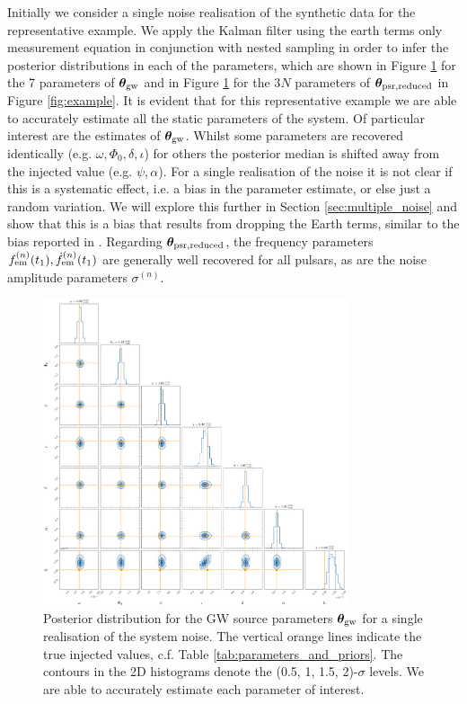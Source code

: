 \documentclass[fleqn,usenatbib,useAMS]{mnras}
\begin{document}
Initially we consider a single noise realisation of the synthetic data for the representative example. We apply the Kalman filter using the earth terms only measurement equation in conjunction with nested sampling in order to infer the posterior distributions in each of the parameters, which are shown in Figure \ref{fig:corner_plot_1} for the 7 parameters of  $\boldsymbol{\theta}_{\rm gw}$ and in Figure \ref{fig:corner_plot_1} for the 3$N$ parameters of $\boldsymbol{\theta}_{\rm psr, reduced}$ in Figure \ref{fig:example}. It is evident that for this representative example we are able to accurately estimate all the static parameters of the system. Of particular interest are the estimates of $\boldsymbol{\theta}_{\rm gw}$. Whilst some parameters are recovered identically (e.g. $\omega, \Phi_0, \delta, \iota$) for others the posterior median is shifted away from the injected value (e.g. $\psi, \alpha$). For a single realisation of the noise it is not clear if this is a systematic effect, i.e. a bias in the parameter estimate, or else just a random variation. We will explore this further in Section \ref{sec:multiple_noise} and show that this is a bias that results from dropping the Earth terms, similar to the bias reported in \cite{Zhupulsarterms}. Regarding $\boldsymbol{\theta}_{\rm psr, reduced}$, the frequency parameters $f_{\rm em}^{(n)}(t_1),\dot{f}_{\rm em}^{(n)}(t_1)$ are generally well recovered for all pulsars, as are the noise amplitude parameters $\sigma^{(n)}$. 
\begin{figure}
	\includegraphics[width=0.8\textwidth]{images/1237_broad_GW}
	\caption{Posterior distribution for the GW source parameters $\boldsymbol{\theta}_{\rm gw}$ for a single realisation of the system noise. The vertical orange lines indicate the true injected values, c.f. Table \ref{tab:parameters_and_priors}. The contours in the 2D histograms denote the (0.5, 1, 1.5, 2)-$\sigma$ levels. We are able to accurately estimate each parameter of interest.}
	\label{fig:corner_plot_1}
\end{figure}
\end{document}
